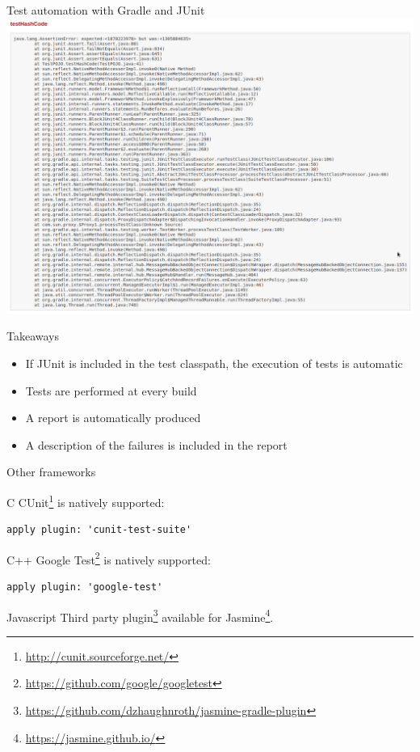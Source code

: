 \documentclass[presentation]{beamer}
\newcommand{\fnurl}[1]{\footnote{\url{#1}}}
\begin{document}
\begin{frame}{Test automation with Gradle and JUnit}
    \includegraphics[width=.9\textwidth,height=.8\textheight,keepaspectratio]{img/gradleTestReport3}
    \begin{block}{Takeaways}
        \begin{itemize}
            \item If JUnit is included in the test classpath, the execution of tests is automatic
            \item Tests are performed at every build
            \item A report is automatically produced
            \item A description of the failures is included in the report
        \end{itemize}
    \end{block}
\end{frame}

\begin{frame}{Other frameworks}
    \begin{block}{C}
        CUnit\footnote{\url{http://cunit.sourceforge.net/}} is natively supported:
        \begin{verbatim}
apply plugin: 'cunit-test-suite'
        \end{verbatim}
    \end{block}
    \begin{block}{C++}
        Google Test\footnote{\url{https://github.com/google/googletest}} is natively supported:
        \begin{verbatim}
apply plugin: 'google-test'
        \end{verbatim}
    \end{block}
    \begin{block}{Javascript}
        Third party plugin\fnurl{https://github.com/dzhaughnroth/jasmine-gradle-plugin} available for Jasmine\footnote{\url{https://jasmine.github.io/}}.
    \end{block}
\end{frame}
\end{document}
